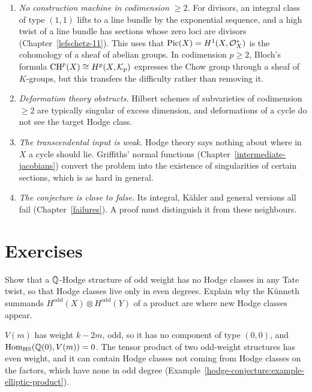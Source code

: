 \begin{remark}[Difficulty]\label{hodge-conjecture:remark-difficulty}
\begin{enumerate}
\item \emph{No construction machine in codimension $\geq 2$.} For divisors, an integral class of type $(1,1)$ lifts to a line bundle by the exponential sequence, and a high twist of a line bundle
has sections whose zero loci are divisors (Chapter~\ref{lefschetz-11}). This uses that $\operatorname{Pic}(X) = H^1(X, \mathcal{O}_X^*)$ is the cohomology of a sheaf of abelian groups. In codimension $p \geq 2$,
Bloch's formula $\operatorname{CH}^p(X) \cong H^p(X, \mathcal{K}_p)$ expresses the Chow group through a sheaf of $K$-groups, but this transfers the difficulty rather than removing it.
\item \emph{Deformation theory obstructs.} Hilbert schemes of subvarieties of codimension $\geq 2$ are typically singular of excess dimension, and deformations of a cycle do not see the target
Hodge class.
\item \emph{The transcendental input is weak.} Hodge theory says nothing about where in $X$ a cycle should lie. Griffiths' normal functions (Chapter~\ref{intermediate-jacobians}) convert the problem
into the existence of singularities of certain sections, which is as hard in general.
\item \emph{The conjecture is close to false.} Its integral, K\"ahler and general versions all fail (Chapter~\ref{failures}). A proof must distinguish it from these neighbours.
\end{enumerate}
\end{remark}

\section{Exercises}\label{hodge-conjecture:section-exercises}

\begin{exercise}\label{hodge-conjecture:exercise-odd-weight}
Show that a $\mathbb{Q}$-Hodge structure of odd weight has no Hodge classes in any Tate twist, so that Hodge classes live only in even degrees. Explain why the K\"unneth summands
$H^{\mathrm{odd}}(X) \otimes H^{\mathrm{odd}}(Y)$ of a product are where new Hodge classes appear.
\end{exercise}

\begin{solution}
$V(m)$ has weight $k - 2m$, odd, so it has no component of type $(0,0)$, and $\operatorname{Hom}_{\mathrm{HS}}(\mathbb{Q}(0), V(m)) = 0$. The tensor product of two odd-weight structures has even weight, and it can
contain Hodge classes not coming from Hodge classes on the factors, which have none in odd degree (Example~\ref{hodge-conjecture:example-elliptic-product}).
\end{solution}


